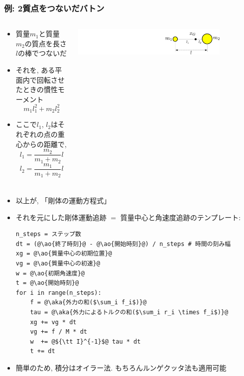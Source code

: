 \documentclass[10pt,dvipdfmx]{beamer}
\newcommand{\ao}[1]{{\color{blue}#1}}
\newcommand{\aka}[1]{{\color{red}#1}}
\begin{document}
\begin{frame}
\frametitle{例: 2質点をつないだバトン}
\begin{columns}
\begin{column}{0.6\textwidth}
\begin{itemize}
\item 質量$m_1$と質量$m_2$の質点を長さ$l$の棒でつないだ
\item それを, ある平面内で回転させたときの慣性モーメント
\[ m_1 l_1^2 + m_2 l_2^2 \]
\item ここで$l_1$, $l_2$はそれぞれの点の重心からの距離で,
\[ l_1 = \frac{m_2}{m_1+m_2}l \]
\[ l_2 = \frac{m_1}{m_1+m_2}l \]
\end{itemize}
\end{column}

\begin{column}{0.4\textwidth}
\begin{center}
\includegraphics[width=0.8\textwidth]{out/pdf/svg/baton2.pdf}
\end{center}
\end{column}
  
\end{columns}

\end{frame}

\begin{frame}[fragile]
\frametitle{}
\begin{itemize}
\item 以上が, 「剛体の運動方程式」
\item それを元にした剛体運動追跡 
$=$ 質量中心と角速度追跡のテンプレート:
\begin{lstlisting}
n_steps = ステップ数
dt = (@\ao{終了時刻}@ - @\ao{開始時刻}@) / n_steps # 時間の刻み幅
xg = @\ao{質量中心の初期位置}@
vg = @\ao{質量中心の初速}@
w = @\ao{初期角速度}@
t = @\ao{開始時刻}@
for i in range(n_steps):
    f = @\aka{外力の和($\sum_i f_i$)}@
    tau = @\aka{外力によるトルクの和($\sum_i r_i \times f_i$)}@
    xg += vg * dt
    vg += f / M * dt
    w  += @${\tt I}^{-1}$@ tau * dt
    t += dt
\end{lstlisting}

\item 簡単のため, 積分はオイラー法. もちろんルンゲクッタ法も適用可能
\end{itemize}

\end{frame}
\end{document}
